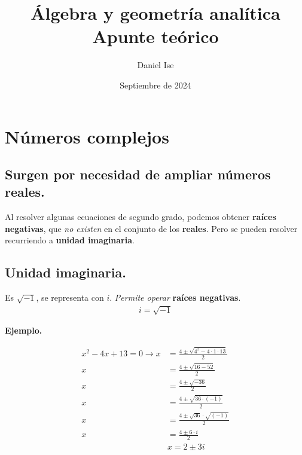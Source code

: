 \documentclass[12pt]{article}
\title{Álgebra y geometría analítica\\Apunte teórico}
\author{Daniel Ise}
\date{Septiembre de 2024}
\begin{document}
\maketitle

\tableofcontents

\pagebreak

\section{Números complejos}

\subsection{Surgen por necesidad de ampliar números reales.}

Al resolver algunas ecuaciones de segundo grado,
podemos obtener \textbf{raíces negativas},
que \textit{no existen} en el conjunto de los \textbf{reales}.
Pero se pueden resolver recurriendo a \textbf{unidad imaginaria}.

\subsection{Unidad imaginaria.}

Es \(\sqrt{-1}\),
se representa con \(i\).
\textit{Permite operar} \textbf{raíces negativas}.
\begin{align*}
    i = \sqrt{-1}
\end{align*}

\textbf{Ejemplo.}

\begin{align*}
    x^2 - 4x + 13 = 0 \rightarrow x & = \frac{4 \pm \sqrt{4^{2} - 4 \cdot 1 \cdot 13}}{2} \\
    x                               & = \frac{4 \pm \sqrt{16 - 52}}{2}                    \\
    x                               & = \frac{4 \pm \sqrt{-36}}{2}                        \\
    x                               & = \frac{4 \pm \sqrt{36 \cdot (-1)}}{2}              \\
    x                               & = \frac{4 \pm \sqrt{36} \cdot \sqrt{(-1)}}{2}       \\
    x                               & = \frac{4 \pm 6 \cdot i}{2}                         \\
                                    & \boxed{x  = 2 \pm 3i}                               \\
\end{align*}
\end{document}
